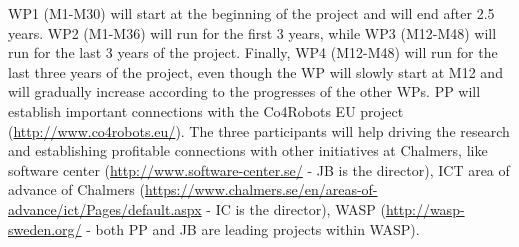 \documentclass[12pt]{article}
\begin{document}
WP1 (M1-M30) will start at the beginning of the project and will end after 2.5 years.  WP2 (M1-M36) will run for the first 3 years, while WP3 (M12-M48) will run for the last 3 years of the project. 
Finally,  WP4 (M12-M48) will run for the last three years of the project, even though the WP will slowly start at M12 and will gradually increase according to the progresses of the other WPs. PP will establish important connections with the Co4Robots EU project ({\small \url{http://www.co4robots.eu/}}). The three participants will help driving the research and establishing profitable connections with other initiatives at Chalmers, like software center ({\small \url{http://www.software-center.se/}} - JB is the director), ICT area of advance of Chalmers ({\small \url{https://www.chalmers.se/en/areas-of-advance/ict/Pages/default.aspx}} - IC is the director), WASP ({\small \url{http://wasp-sweden.org/}} - both PP and JB are leading projects within WASP). 

\end{document}

